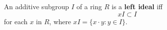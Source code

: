 An additive subgroup $I$ of a ring $R$ is a \textbf{left ideal} iff
$$xI \subset I$$
for each $x$ in $R$, where $xI = \{x \cdot y : y \in I\}$.
